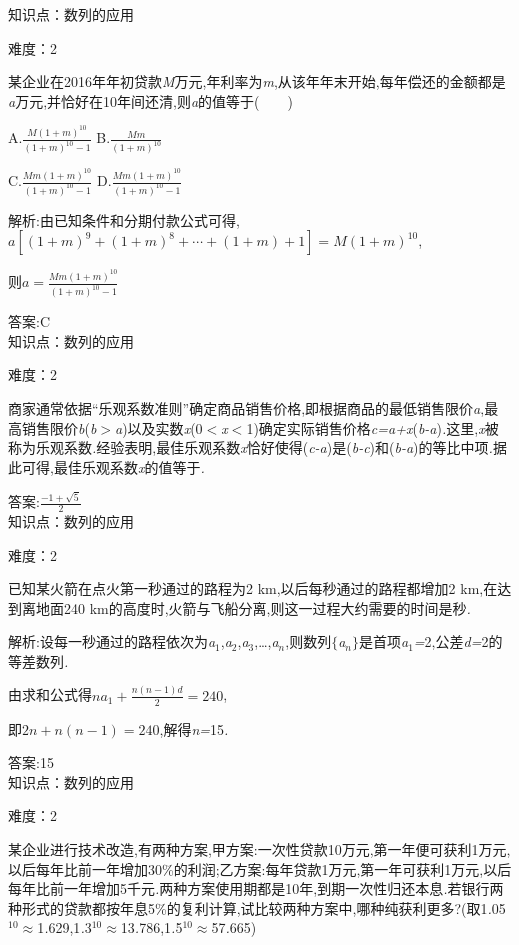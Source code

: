 \documentclass{article} %
\begin{document}
知识点：数列的应用

难度：2

 某企业在2016年年初贷款\textit{M}万元,年利率为\textit{m},从该年年末开始,每年偿还的金额都是\textit{a}万元,并恰好在10年间还清,则\textit{a}的值等于(\textit{　　})

 A.$\frac{M(1+m)^{10}}{(1+m)^{10}-1}$ B.$\frac{Mm}{(1+m)^{10}}$

 C.$\frac{Mm(1+m)^{10}}{(1+m)^{10}-1}$ D.$\frac{Mm(1+m)^{10}}{(1+m)^{10}-1}$

 解析:由已知条件和分期付款公式可得,$a[(1+m)^9+(1+m)^8+\cdots+(1+m)+1]=M(1+m)^{10}$,

则$a=\frac{Mm(1+m)^{10}}{(1+m)^{10}-1}$

 答案:C \\

知识点：数列的应用

难度：2

 商家通常依据``乐观系数准则''确定商品销售价格,即根据商品的最低销售限价\textit{a},最高销售限价\textit{b}(\textit{b$>$a})以及实数\textit{x}(0\textit{$<$x$<$}1)确定实际销售价格\textit{c=a+x}(\textit{b-a})\textit{.}这里,\textit{x}被称为乐观系数\textit{.}经验表明,最佳乐观系数\textit{x}恰好使得(\textit{c-a})是(\textit{b-c})和(\textit{b-a})的等比中项\textit{.}据此可得,最佳乐观系数\textit{x}的值等于\textit{\underbar{　　　　　}.~}

 答案:$\frac{-1+\sqrt{5}}{2}$ \\

知识点：数列的应用

难度：2

 已知某火箭在点火第一秒通过的路程为2 km,以后每秒通过的路程都增加2 km,在达到离地面240 km的高度时,火箭与飞船分离,则这一过程大约需要的时间是\textit{\underbar{　　　　　}}秒\textit{.~}

 解析:设每一秒通过的路程依次为\textit{a}${}_{1}$,\textit{a}${}_{2}$,\textit{a}${}_{3}$,{\dots},\textit{a${}_{n}$},则数列$\mathrm{\{}$\textit{a${}_{n}$}$\mathrm{\}}$是首项\textit{a}${}_{1}$\textit{=}2,公差\textit{d=}2的等差数列\textit{.}

由求和公式得$na_1+\frac{n(n-1)d}{2}=240$,

即$2n+n(n-1)=240$,解得\textit{n=}15\textit{.}

 答案:15 \\

知识点：数列的应用

难度：2

 某企业进行技术改造,有两种方案,甲方案:一次性贷款10万元,第一年便可获利1万元,以后每年比前一年增加30\%的利润;乙方案:每年贷款1万元,第一年可获利1万元,以后每年比前一年增加5千元\textit{.}两种方案使用期都是10年,到期一次性归还本息\textit{.}若银行两种形式的贷款都按年息5\%的复利计算,试比较两种方案中,哪种纯获利更多?(取1\textit{.}05${}^{10}$$\mathrm{\approx}$1\textit{.}629,1\textit{.}3${}^{10}$$\mathrm{\approx}$13\textit{.}786,1\textit{.}5${}^{10}$$\mathrm{\approx}$57\textit{.}665)
\end{document}
